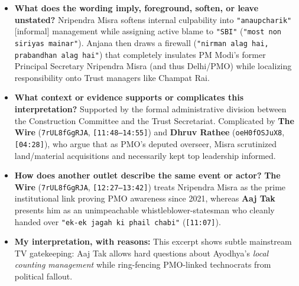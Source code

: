 \documentclass[10pt,a4paper]{article}
\begin{document}
\begin{itemize}[leftmargin=1.5em, itemsep=3pt, topsep=4pt]
  \item \textbf{What does the wording imply, foreground, soften, or leave unstated?} Nripendra Misra softens internal culpability into \texttt{"anaupcharik"} [informal] management while assigning active blame to \texttt{"SBI"} (\texttt{"most non siriyas mainar"}). Anjana then draws a firewall (\texttt{"nirman alag hai, prabandhan alag hai"}) that completely insulates PM Modi's former Principal Secretary Nripendra Misra (and thus Delhi/PMO) while localizing responsibility onto Trust managers like Champat Rai.
  \item \textbf{What context or evidence supports or complicates this interpretation?} Supported by the formal administrative division between the Construction Committee and the Trust Secretariat. Complicated by \textbf{The Wire} (\texttt{7rUL8fGgRJA}, \texttt{[11:48--14:55]}) and \textbf{Dhruv Rathee} (\texttt{oeH0fOSJuX8}, \texttt{[04:28]}), who argue that as PMO's deputed overseer, Misra scrutinized land/material acquisitions and necessarily kept top leadership informed.
  \item \textbf{How does another outlet describe the same event or actor?} \textbf{The Wire} (\texttt{7rUL8fGgRJA}, \texttt{[12:27--13:42]}) treats Nripendra Misra as the prime institutional link proving PMO awareness since 2021, whereas \textbf{Aaj Tak} presents him as an unimpeachable whistleblower-statesman who cleanly handed over \texttt{"ek-ek jagah ki phail chabi"} (\texttt{[11:07]}).
  \item \textbf{My interpretation, with reasons:} This excerpt shows subtle mainstream TV gatekeeping: Aaj Tak allows hard questions about Ayodhya's \textit{local counting management} while ring-fencing PMO-linked technocrats from political fallout.
\end{itemize}
\end{document}
